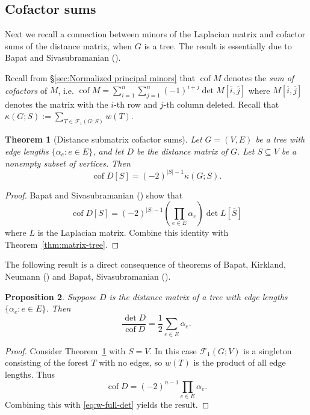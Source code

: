 \documentclass[12pt]{amsart}
\newtheorem{thm}{Theorem}[section]
\newtheorem{prop}[thm]{Proposition}
\theoremstyle{definition}
\newcommand{\Da}{{D}}
\newcommand{\La}{L}
\DeclareMathOperator{\cof}{cof}
\newcommand{\trees}{\mathcal{F}_1}
\begin{document}
\subsection{Cofactor sums}

Next we recall a connection between minors of the Laplacian matrix and cofactor sums of the distance matrix, when $G$ is a tree.
The result is essentially due to Bapat and Sivasubramanian (\cite{bapat-sivasubramanian}).

Recall from \S\ref{sec:Normalized principal minors} that $\cof M$ denotes the {\em sum of cofactors} of $M$, i.e. 
$\displaystyle
	\cof M = \sum_{i = 1}^{n} \sum_{j = 1}^{n} (-1)^{i + j} \det M[\overline{i}, \overline{j}]
$
where $M[\overline{i}, \overline{j}]$ denotes the matrix with the $i$-th row and $j$-th column deleted.
Recall that $\kappa(G; S)  :=  \sum_{T \in \trees(G; S)} w(T)$.

\begin{thm}[Distance submatrix cofactor sums]
\label{thm:distance-sub-cof}
Let $G = (V, E)$ be a tree with edge lengths $\{\alpha_e \colon e \in E\}$,
and let $\Da$ be the distance matrix of $G$.
Let $S \subseteq V$ be a nonempty subset of vertices. 
Then
\begin{equation}
	\cof \Da[S] = (-2)^{|S| - 1} \kappa(G; S) .
\end{equation}
\end{thm}
\begin{proof}
Bapat and Sivasubramanian (\cite[Theorem 11]{bapat-sivasubramanian})
show that
\[
	\cof \Da[S] = (-2)^{|S|-1} \left( \prod_{e \in E} \alpha_e \right) \det \La[\overline S] 
\]
where $\La$ is the Laplacian matrix.
Combine this identity with Theorem~\ref{thm:matrix-tree}.
\end{proof}

The following result is a direct consequence of theorems of Bapat, Kirkland, Neumann (\cite{bapat-kirkland-neumann}) and Bapat, Sivasubramanian (\cite{bapat-sivasubramanian}).

\begin{prop}\label{prop:full-det-cof-ratio}
	Suppose $\Da$ is the distance matrix of a tree with edge lengths $\{\alpha_e \colon e \in E\}$.
	Then
	\[
		\frac{\det \Da}{\cof \Da} = \frac1{2} \sum_{e \in E} \alpha_e .
	\]
\end{prop}
\begin{proof}
Consider Theorem~\ref{thm:distance-sub-cof} with $S = V$.
In this case $\trees(G; V)$ is a singleton consisting of the forest $T$ with no edges, so $w({T})$ is the product of all edge lengths.
Thus
\[
	\cof \Da = (-2)^{n - 1} \prod_{e \in E} \alpha_e .
\]
Combining this with \eqref{eq:w-full-det} yields the result.
\end{proof}
\end{document}
